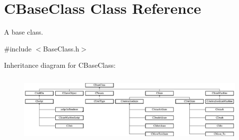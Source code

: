 \hypertarget{class_c_base_class}{}\section{C\+Base\+Class Class Reference}
\label{class_c_base_class}


A base class.  




{\ttfamily \#include $<$Base\+Class.\+h$>$}

Inheritance diagram for C\+Base\+Class\+:\begin{figure}[H]
\begin{center}
\leavevmode
\includegraphics[height=3.478261cm]{class_c_base_class}
\end{center}
\end{figure}
